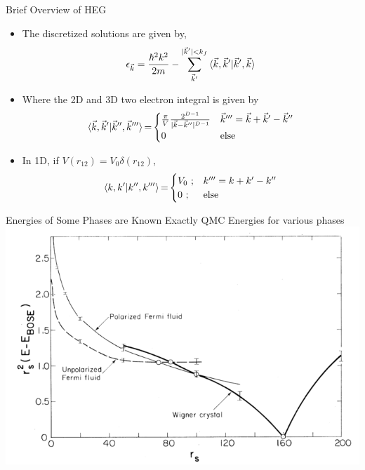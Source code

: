 \documentclass[10pt]{beamer}
\begin{document}
{{{{{{{\begin{frame}{Brief Overview of HEG}
	\begin{itemize}[<+->]
		\item{The discretized solutions are given by,
		\begin{eqnarray}\label{eq:hf_orb_energy}
			\epsilon_{\vec{k}}=
				\frac{\hbar^2 k^2}{2m} - \sum\limits_{\vec{k}'}^{|\vec{k}'|< k_f}
				\braket{\vec{k}, \vec{k}' |\vec{k}', \vec{k}}
		\end{eqnarray}
		}
		\item{Where the 2D and 3D two electron integral is given by
  		\begin{equation}
  			\braket{\vec{k}, \vec{k}'|\vec{k}'',\vec{k}'''}{=}
  				\begin{cases}
  				\frac{\pi}{V}\frac{2^{D-1}}{|\vec{k}-\vec{k}''|^{D-1}}
  				& \vec{k}''' = \vec{k}+\vec{k}'-\vec{k}'' \nonumber\\
  				0
  				& \text{else}
  				\end{cases}
  		\end{equation}
		}
		\item{ In 1D, if $V(r_{12}) = V_0\delta{(r_{12})}$,
		  \begin{equation}
  			\braket{k, k'|k'',k'''}{=}
  				\begin{cases}
  				V_0\text{ ;}
  				& k''' = k+k'-k'' \\
  				0\text{ ;}
  				& \text{else}
  				\end{cases}
		  \end{equation}
		}
	\end{itemize}
\end{frame}

{%

\begin{frame}{Energies of Some Phases are Known Exactly}
  \centering
	QMC Energies for various phases
	\includegraphics[width=.85\linewidth]{../figures/Ceperley_PhaseDiag.png}
\end{frame}


}}}}}}}}
\end{document}
